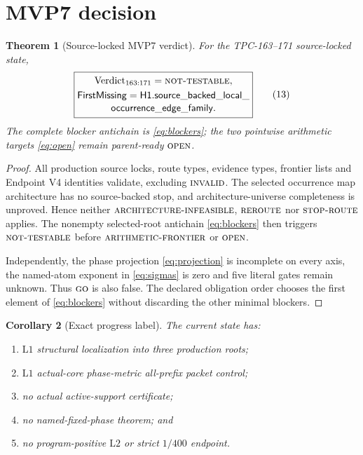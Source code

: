 \documentclass[11pt]{article}
\newtheorem{theorem}{Theorem}[section]
\newtheorem{corollary}[theorem]{Corollary}
\theoremstyle{definition}
\theoremstyle{remark}
\newcommand{\GO}{\textnormal{\textsc{go}}}
\newcommand{\AINF}{\textnormal{\textsc{architecture-infeasible}}}
\newcommand{\REROUTE}{\textnormal{\textsc{reroute}}}
\newcommand{\STOPR}{\textnormal{\textsc{stop-route}}}
\newcommand{\NT}{\textnormal{\textsc{not-testable}}}
\newcommand{\AF}{\textnormal{\textsc{arithmetic-frontier}}}
\newcommand{\OPEN}{\textnormal{\textsc{open}}}
\newcommand{\INVALID}{\textnormal{\textsc{invalid}}}
\newcommand{\Lone}{\mathrm{L1}}
\newcommand{\Ltwo}{\mathrm{L2}}
\begin{document}
\section{MVP7 decision}

\begin{theorem}[Source-locked MVP7 verdict]
\label{thm:mvp7}
For the TPC-163--171 source-locked state,
\[
\boxed{
\begin{gathered}
\operatorname{Verdict}_{163:171}=\NT,\\
\mathsf{FirstMissing}
=\mathsf{H1.source\_backed\_local\_}\\[-2pt]
\mathsf{occurrence\_edge\_family}.
\end{gathered}
}
\tag{13}\label{eq:mvp7}
\]
The complete blocker antichain is \eqref{eq:blockers}; the two
pointwise arithmetic targets \eqref{eq:open} remain parent-ready
\(\OPEN\).
\end{theorem}

\begin{proof}
All production source locks, route types, evidence types, frontier
lists and Endpoint V4 identities validate, excluding \(\INVALID\).
The selected occurrence map architecture has no source-backed stop,
and architecture-universe completeness is unproved.  Hence neither
\(\AINF\), \(\REROUTE\) nor \(\STOPR\) applies.  The nonempty
selected-root antichain \eqref{eq:blockers} then triggers \(\NT\)
before \(\AF\) or \(\OPEN\).

Independently, the phase projection \eqref{eq:projection} is
incomplete on every axis, the named-atom exponent in
\eqref{eq:sigmas} is zero and five literal gates remain unknown.
Thus \(\GO\) is also false.  The declared obligation order chooses
the first element of \eqref{eq:blockers} without discarding the other
minimal blockers.
\end{proof}

\begin{corollary}[Exact progress label]
The current state has:
\begin{enumerate}[leftmargin=2em]
\item \(\Lone\) structural localization into three production roots;
\item \(\Lone\) actual-core phase-metric all-prefix packet control;
\item no actual active-support certificate;
\item no named-fixed-phase theorem; and
\item no program-positive \(\Ltwo\) or strict \(1/400\) endpoint.
\end{enumerate}
\end{corollary}
\end{document}
